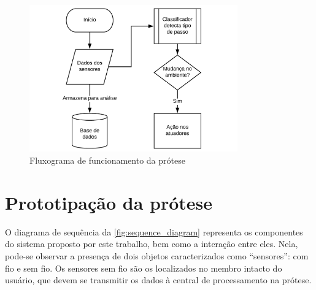 \begin{figure}[ht]
	\caption{\label{fig:flowchart}Fluxograma de funcionamento da prótese}
	\begin{center}
	    \includegraphics[width=0.8\textwidth]{resources/flowchart}
	\end{center}
\end{figure}


\section{Prototipação da prótese}\label{sec:metodo_prototipacao}
O diagrama de sequência da \autoref{fig:sequence_diagram} representa os componentes do sistema proposto por este trabalho, bem como a interação entre eles. Nela, pode-se observar a presença de dois objetos caracterizados como ``sensores'': com fio e sem fio. Os sensores sem fio são os localizados no membro intacto do usuário, que devem se transmitir os dados à central de processamento na prótese.

